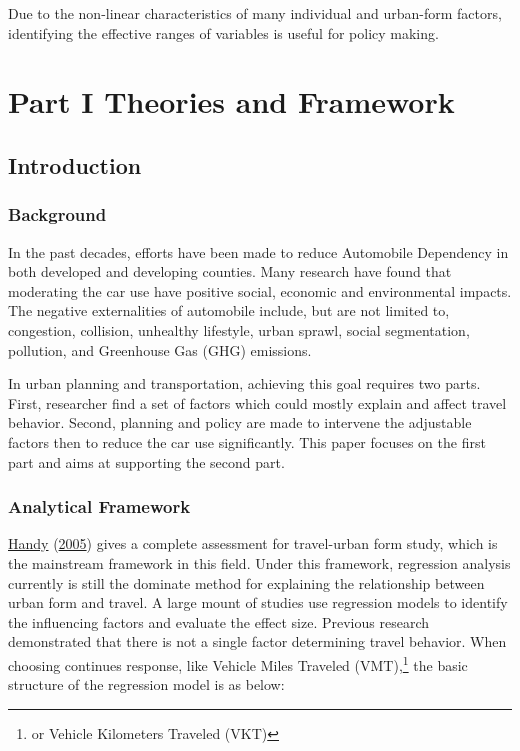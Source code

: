 \documentclass[
  11pt,
  openany]{memoir}
\begin{document}
Due to the non-linear characteristics of many individual and urban-form factors, identifying the effective ranges of variables is useful for policy making.

\hypertarget{part-part-i-theories-and-framework}{%
\part*{Part I Theories and Framework}\label{part-part-i-theories-and-framework}}

\hypertarget{intro}{%
\chapter{Introduction}\label{intro}}

\hypertarget{background}{%
\section{Background}\label{background}}

In the past decades, efforts have been made to reduce Automobile Dependency in both developed and developing counties. Many research have found that moderating the car use have positive social, economic and environmental impacts. The negative externalities of automobile include, but are not limited to, congestion, collision, unhealthy lifestyle, urban sprawl, social segmentation, pollution, and Greenhouse Gas (GHG) emissions.

In urban planning and transportation, achieving this goal requires two parts. First, researcher find a set of factors which could mostly explain and affect travel behavior. Second, planning and policy are made to intervene the adjustable factors then to reduce the car use significantly.
This paper focuses on the first part and aims at supporting the second part.

\hypertarget{analytical-framework}{%
\section{Analytical Framework}\label{analytical-framework}}

\protect\hyperlink{ref-handyCriticalAssessmentLiterature2005}{Handy} (\protect\hyperlink{ref-handyCriticalAssessmentLiterature2005}{2005}) gives a complete assessment for travel-urban form study, which is the mainstream framework in this field.
Under this framework, regression analysis currently is still the dominate method for explaining the relationship between urban form and travel.
A large mount of studies use regression models to identify the influencing factors and evaluate the effect size. Previous research demonstrated that there is not a single factor determining travel behavior. When choosing continues response, like Vehicle Miles Traveled (VMT),\footnote{or Vehicle Kilometers Traveled (VKT)} the basic structure of the regression model is as below:
\end{document}
